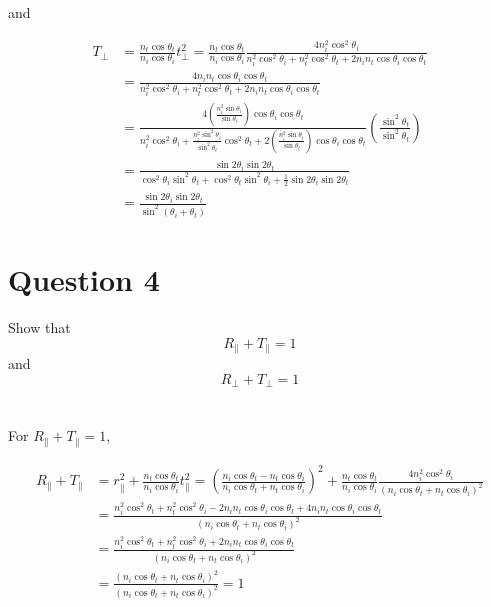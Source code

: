 \documentclass[a4paper]{article}
\begin{document}
and

\begin{align}
    T_\perp &= \frac{n_t \cos \theta_t}{n_i \cos \theta_i} t_\perp^2 = \frac{n_t \cos \theta_t}{n_i \cos \theta_i} \frac{4 n_i^2 \cos^2 \theta_i}{n_i^2 \cos^2 \theta_i + n_t^2\cos^2 \theta_t + 2 n_i n_t \cos \theta_i \cos \theta_t}\\
    &=\frac{4 n_i n_t \cos \theta_i \cos \theta_t}{n_i^2 \cos^2 \theta_i + n_t^2\cos^2 \theta_t + 2 n_i n_t \cos \theta_i \cos \theta_t}\\
    &=\frac{4\left(\frac{n_i^2 \sin \theta_i}{\sin \theta_t}\right)\cos \theta_i \cos \theta_t}{n_i^2\cos^2 \theta_i + \frac{n_i^2 \sin^2 \theta_i}{\sin^2 \theta_t} \cos^2 \theta_t + 2\left(\frac{n_i^2 \sin \theta_i}{\sin \theta_t}\right)\cos \theta_i \cos \theta_t} \left( \frac{\sin^2 \theta_t}{\sin^2 \theta_t} \right)\\
    &=\frac{\sin 2 \theta_i \sin 2 \theta_t}{\cos^2 \theta_i \sin^2 \theta_t + \cos^2 \theta_t \sin^2 \theta_i + \frac{1}{2}\sin 2 \theta_i \sin 2 \theta_t}\\
    &=\frac{\sin 2 \theta_i \sin 2 \theta_t}{\sin^2 (\theta_i + \theta_t)}
\end{align}
\section*{Question 4}
Show that
\[
    R_\parallel  + T_\parallel = 1
\]
and
\[
    R_\perp  + T_\perp = 1
\]\\\\

For $R_\parallel  + T_\parallel = 1$,

\begin{align}
    R_\parallel  + T_\parallel &= r_\parallel^2 + \frac{n_t \cos \theta_t}{n_i \cos \theta_i}t_\parallel^2 = \left(\frac{n_i \cos \theta_t - n_t \cos \theta_i}{n_i \cos \theta_t + n_t \cos \theta_i}\right)^2 + \frac{n_t \cos \theta_t}{n_i \cos \theta_i}\frac{4 n_i^2 \cos^2 \theta_i}{(n_i \cos \theta_t + n_t \cos \theta_i)^2}\\
    &= \frac{n_i^2 \cos^2 \theta_t + n_t^2 \cos^2 \theta_i - 2 n_i n_t \cos \theta_i \cos \theta_t + 4 n_i n_t \cos \theta_i \cos \theta_t}{(n_i \cos \theta_t + n_t \cos \theta_i)^2}\\
    &= \frac{n_i^2 \cos^2 \theta_t + n_t^2 \cos^2 \theta_i + 2 n_i n_t \cos \theta_i \cos \theta_t}{(n_i \cos \theta_t + n_t \cos \theta_i)^2}\\
    &= \frac{(n_i \cos \theta_t + n_t \cos \theta_i)^2}{(n_i \cos \theta_t + n_t \cos \theta_i)^2} = 1
\end{align}
\end{document}
